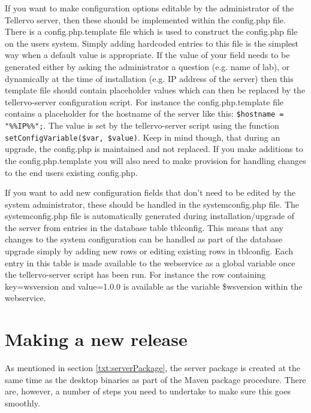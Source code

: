 If you want to make configuration options editable by the administrator of the Tellervo server, then these should be implemented within the config.php file.  There is a config.php.template file which is used to construct the config.php file on the users system.  Simply adding hardcoded entries to this file is the simplest way when a default value is appropriate.  If the value of your field needs to be generated either by asking the administrator a question (e.g. name of lab), or dynamically at the time of installation (e.g. IP address of the server) then this template file should contain placeholder values which can then be replaced by the tellervo-server configuration script.  For instance the config.php.template file contains a placeholder for the hostname of the server like this: \verb|$hostname = "%%IP%%";|.  The value is set by the tellervo-server script using the function \verb|setConfigVariable($var, $value)|.  Keep in mind though, that during an upgrade, the config.php is maintained and not replaced.  If you make additions to the config.php.template you will also need to make provision for handling changes to the end users existing config.php.

If you want to add new configuration fields that don't need to be edited by the system administrator, these should be handled in the systemconfig.php file.  The systemconfig.php file is automatically generated during installation/upgrade of the server from entries in the database table tblconfig.  This means that any changes to the system configuration can be handled as part of the database upgrade simply by adding new rows or editing existing rows in tblconfig.  Each entry in this table is made available to the webservice as a global variable once the tellervo-server script has been run.  For instance the row containing key=wsversion and value=1.0.0 is available as the variable \$wsversion within the webservice. 



\section{Making a new release}

As mentioned in section \ref{txt:serverPackage}, the server package is created at the same time as the desktop binaries as part of the Maven package procedure.  There are, however, a number of steps you need to undertake to make sure this goes smoothly.

